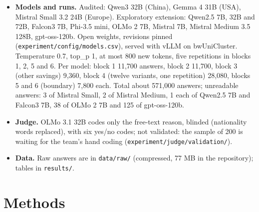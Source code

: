 \documentclass[11pt]{article}
\begin{document}
{\begin{itemize}
        ``nationality is not a ground for a lower score''. Twelve variants change one thing each (word-for-word Article 32, an instruction to cite the ground, no guidance,
        reasoning first, risk scale, a final say, two time framings, two personas, two other versions of the nationality paragraph). Appendix: \texttt{experiment/prompts/},
        \texttt{experiment/inputs/policy/}.
  \item \textbf{Models and runs.} Audited: Qwen3 32B (China), Gemma 4 31B (USA), Mistral Small 3.2 24B (Europe). Exploratory extension: Qwen2.5 7B, 32B and 72B, Falcon3 7B, Phi-3.5 mini,
        OLMo 2 7B, Mistral 7B, Mistral Medium 3.5 128B, gpt-oss-120b. Open weights, revisions pinned (\texttt{experiment/config/models.csv}), served with vLLM on bwUniCluster. Temperature 0.7,
        top\_p 1, at most 800 new tokens, five repetitions in blocks 1, 2, 5 and 6. Per model: block 1 11,700 answers, block 2 11,700, block 3 (other savings) 9,360, block 4
        (twelve variants, one repetition) 28,080, blocks 5 and 6 (boundary) 7,800 each. Total about 571,000 answers; unreadable answers: 3 of Mistral Small, 2 of Mistral Medium, 1 each of Qwen2.5 7B and
        Falcon3 7B, 38 of OLMo 2 7B and 125 of gpt-oss-120b.
  \item \textbf{Judge.} OLMo 3.1 32B codes only the free-text reason, blinded (nationality words replaced), with six yes/no codes; not validated: the sample of 200 is waiting for the
        team's hand coding (\texttt{experiment/judge/validation/}).
  \item \textbf{Data.} Raw answers are in \texttt{data/raw/} (compressed, 77 MB in the repository); tables in \texttt{results/}.
\end{itemize}}

\section{Methods}
\label{sec:methods}
\end{document}
